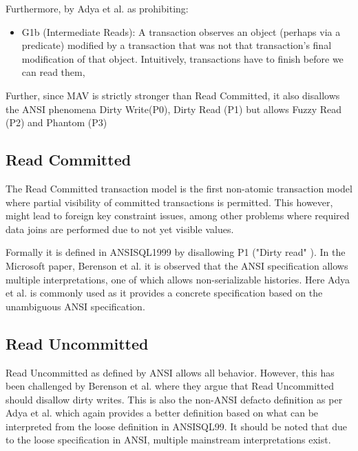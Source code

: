 \documentclass[a4paper,10pt,titlepage]{report}
\begin{document}
Furthermore, by Adya et al. \cite{Adya99weakconsistency} as prohibiting:
\begin{itemize}
    \item G1b (Intermediate Reads): A transaction observes an object (perhaps via a predicate) modified by a transaction that was not that transaction's final modification of that object. Intuitively, transactions have to finish before we can read them,
\end{itemize}

Further, since MAV is strictly stronger than Read Committed, it also disallows the ANSI phenomena Dirty Write(P0), Dirty Read (P1) but allows Fuzzy Read (P2) and Phantom (P3)

\subsection{Read Committed}
The Read Committed transaction model is the first non-atomic transaction model where partial visibility of committed transactions is permitted. This however, might lead to foreign key constraint issues, among other problems where required data joins are performed due to not yet visible values.
\\ \vspace{5mm}

Formally it is defined in ANSISQL1999\cite{ansisql1999} by disallowing P1 ("Dirty read" ). In the Microsoft paper, Berenson et al. \cite{Berensonetal} it is observed that the ANSI specification allows multiple interpretations, one of which allows non-serializable histories. Here Adya et al.\cite{Adya99weakconsistency} is commonly used as it provides a concrete specification based on the unambiguous ANSI specification.
\\ \vspace{5mm}


\subsection{Read Uncommitted}
Read Uncommitted as defined by ANSI allows all behavior. However, this has been challenged by Berenson et al. \cite{Berensonetal} where they argue that Read Uncommitted should disallow dirty writes. This is also the non-ANSI defacto definition as per Adya et al. \cite{Adya99weakconsistency} which again provides a better definition based on what can be interpreted from the loose definition in ANSISQL99\cite{ansisql1999}. It should be noted that due to the loose specification in ANSI, multiple mainstream interpretations exist.\\
\end{document}
